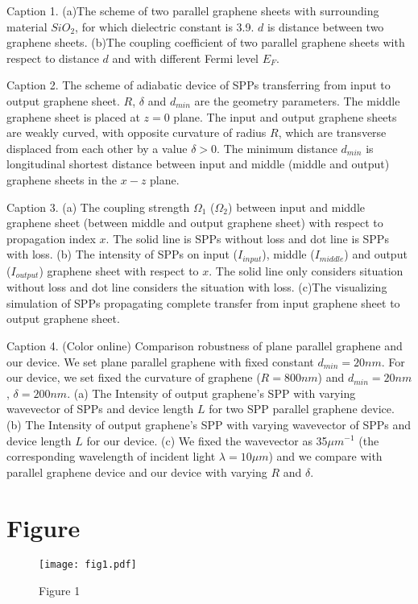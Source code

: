 \documentclass[preprint,12pt,numbers,sort&compress]{elsarticle}
\begin{document}
Caption 1.
(a)The scheme of two parallel graphene sheets with surrounding material $SiO_2$, for which dielectric constant is 3.9. $d$ is distance between two graphene sheets. (b)The coupling coefficient of two parallel graphene sheets with respect to distance $d$ and with different Fermi level $E_{F}$.


Caption 2.
The scheme of adiabatic device of SPPs transferring from input to output graphene sheet. $R$, $\delta$ and $d_{min}$ are the geometry parameters. The middle graphene sheet is placed at $z=0$ plane. The input and output graphene sheets are weakly curved, with opposite curvature of radius $R$, which are transverse displaced from each other by a value $\delta > 0$. The minimum distance $d_{min}$ is longitudinal shortest distance between input and middle (middle and output) graphene sheets in the $x-z$ plane.


Caption 3.
(a) The coupling strength $\Omega_1$ ($\Omega_2$) between input and middle graphene sheet (between middle and output graphene sheet) with respect to propagation index $x$. The solid line is SPPs without loss and dot line is SPPs with loss. (b) The intensity of SPPs on input ($I_{input}$), middle ($I_{middle}$) and output ($I_{output}$) graphene sheet with respect to $x$. The solid line only considers situation without loss and dot line considers the situation with loss. (c)The visualizing simulation of SPPs propagating complete transfer from input graphene sheet to output graphene sheet.


Caption 4. (Color online)
Comparison robustness of plane parallel graphene and our device. We set plane parallel graphene with fixed constant $d_{min}=20nm$. For our device, we set fixed the curvature of graphene ($R=800nm$) and $d_{min}=20nm$, $\delta=200nm$. (a) The Intensity of output graphene's SPP with varying wavevector of SPPs and device length $L$ for two SPP parallel graphene device. (b) The Intensity of output graphene's SPP with varying wavevector of SPPs and device length $L$ for our device. (c) We fixed the wavevector as 35$\mu m^{-1}$ (the corresponding wavelength of incident light $\lambda=10 \mu m$) and we compare with parallel graphene device and our device with varying $R$ and $\delta$.

\newpage
\section*{Figure}
\begin{figure}[h]
\centering
\texttt{[image: fig1.pdf]}
\begin{center}
Figure 1
\end{center}
\label{device1}
\end{figure}
\end{document}
